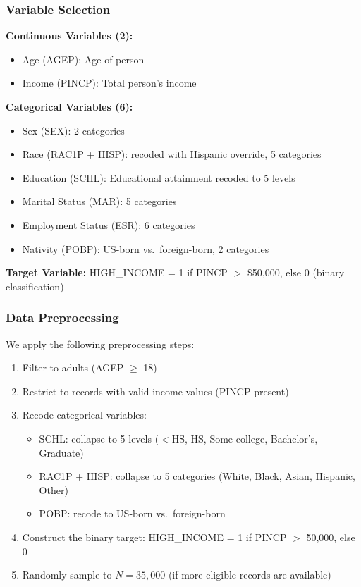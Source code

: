 \documentclass[12pt,a4paper]{article}
\begin{document}
\subsubsection{Variable Selection}

\textbf{Continuous Variables (2):}
\begin{itemize}
    \item Age (AGEP): Age of person
    \item Income (PINCP): Total person's income
\end{itemize}

\textbf{Categorical Variables (6):}
\begin{itemize}
    \item Sex (SEX): 2 categories
    \item Race (RAC1P + HISP): recoded with Hispanic override, 5 categories
    \item Education (SCHL): Educational attainment recoded to 5 levels
    \item Marital Status (MAR): 5 categories
    \item Employment Status (ESR): 6 categories
    \item Nativity (POBP): US-born vs.\ foreign-born, 2 categories
\end{itemize}

\textbf{Target Variable:} HIGH\_INCOME = 1 if PINCP $>$ \$50,000, else 0 (binary classification)

\subsubsection{Data Preprocessing}

We apply the following preprocessing steps:
\begin{enumerate}
    \item Filter to adults (AGEP $\geq$ 18)
    \item Restrict to records with valid income values (PINCP present)
    \item Recode categorical variables:
    \begin{itemize}
        \item SCHL: collapse to 5 levels ($<$HS, HS, Some college, Bachelor's, Graduate)
        \item RAC1P + HISP: collapse to 5 categories (White, Black, Asian, Hispanic, Other)
        \item POBP: recode to US-born vs.\ foreign-born
    \end{itemize}
    \item Construct the binary target: HIGH\_INCOME = 1 if PINCP $>$ 50,000, else 0
    \item Randomly sample to $N = 35{,}000$ (if more eligible records are available)
\end{enumerate}
\end{document}
